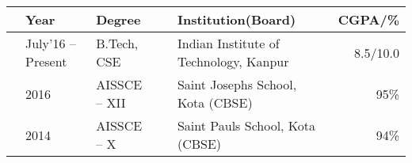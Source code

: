 
\newcommand{\education}[4]{
  & #1 & #2 & &#3 & #4
}


\begin{tabular}{ | L{0.05cm} l | L{3cm} | L{0.05cm} C{8cm} | r |}
  \hline
  \education{\textbf{Year}}{\textbf{Degree}}{\textbf{Institution(Board)}}{\textbf{CGPA/\%}}\\
  \hline
  \education{July'16 -- Present}{B.Tech, CSE}{Indian Institute of Technology, Kanpur}{8.5/10.0}\\
  \education{2016}{AISSCE -- XII}{Saint Josephs School, Kota (CBSE)}{95\%}\\
  \education{2014}{AISSCE -- X}{Saint Pauls School, Kota (CBSE)}{94\%}\\
  \hline
\end{tabular}

